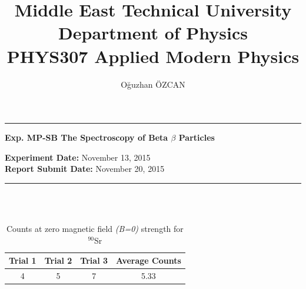 \documentclass[a4paper,12pt]{article}
\title{Middle East Technical University\\Department of Physics\\\textbf{PHYS307 Applied Modern Physics}}
\author{Oğuzhan ÖZCAN\\}
\date{}
\providecommand{\expdate}[1]{\textbf{Experiment Date:} }
\providecommand{\repdate}[1]{\textbf{Report Submit Date:} }
\providecommand{\expname}[1]{\textbf{Exp. MP-SB The Spectroscopy of Beta $\beta$ Particles} }
\begin{document}
\maketitle

\thispagestyle{fancy}

\noindent\rule{18.4cm}{0.8pt}
\begin{center}
	\expname{arg1}{}
\end{center}

\expdate{arg1}{November 13, 2015}\\
\repdate{arg1}{November 20, 2015}\\
\noindent\rule{18.4cm}{0.8pt}\\\\
\begin{table}[h!]
	
	\begin{center}
		\begin{tabular}{|c|c|c|c|}
			\hline \textbf{Trial 1} & \textbf{Trial 2}  & \textbf{Trial 3}  & A\textbf{verage Counts} \\ 
			\hline 4 & 5 & 7 & 5.33 \\ 
			\hline 
		\end{tabular}
		\caption{Counts at zero magnetic field \textit{(B=0)} strength for $^{90}$Sr}
	\end{center} 
\end{table}
\end{document}
